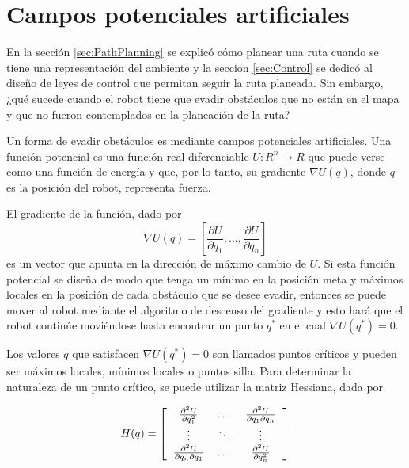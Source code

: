 \section{Campos potenciales artificiales}
En la sección \ref{sec:PathPlanning} se explicó cómo planear una ruta cuando se tiene una representación del ambiente y la seccion \ref{sec:Control} se dedicó al diseño de leyes de control que permitan seguir la ruta planeada. Sin embargo, ¿qué sucede cuando el robot tiene que evadir obstáculos que no están en el mapa y que no fueron contemplados en la planeación de la ruta? 

Un forma de evadir obstáculos es mediante campos potenciales artificiales. Una función potencial es una función real diferenciable $U: R^n \rightarrow R$ que puede verse como una función de energía y que, por lo tanto, su gradiente $\nabla U(q)$, donde $q$ es la posición del robot, representa fuerza. 

El gradiente de la función, dado por
\begin{equation}
\label{eq:PotentialGradient}
\nabla U(q) = \left[\frac{\partial U}{\partial q_1},\dots,\frac{\partial U}{\partial q_n}\right]
\end{equation}
es un vector que apunta en la dirección de máximo cambio de $U$. Si esta función potencial se diseña de modo que tenga un mínimo en la posición meta y máximos locales en la posición de cada obstáculo que se desee evadir, entonces se puede mover al robot mediante el algoritmo de descenso del gradiente y esto hará que el robot continúe moviéndose hasta encontrar un punto $q^*$ en el cual $\nabla U(q^*) = 0$. 

Los valores $q$ que satisfacen $\nabla U(q^*) = 0$ son llamados puntos críticos y pueden ser máximos locales, mínimos locales o puntos silla. Para determinar la naturaleza de un punto crítico, se puede utilizar la matriz Hessiana, dada por

\begin{equation}
\label{eq:Hessian}
H(q) = \left[
\begin{tabular}{ccc}
$\frac{\partial^2 U}{\partial q_1^2}$ &$ \dots$ &$ \frac{\partial^2 U}{\partial q_1 \partial q_n}$\\
$\vdots$ & $\ddots$ & $\vdots$ \\
$\frac{\partial^2 U}{\partial q_n\partial q_1}$ &$ \dots$ &$ \frac{\partial^2 U}{\partial q_n^2}$
\end{tabular}
\right]
\end{equation}

